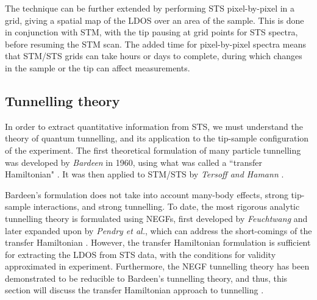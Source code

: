 The technique can be further extended by performing \ac{STS} pixel-by-pixel in a grid, giving a spatial map of the \ac{LDOS} over an area of the sample. This is done in conjunction with \ac{STM}, with the tip pausing at grid points for \ac{STS} spectra, before resuming the \ac{STM} scan. The added time for pixel-by-pixel spectra means that \ac{STM}/\ac{STS} grids can take hours or days to complete, during which changes in the sample or the tip can affect measurements. 


\subsection{Tunnelling theory}
In order to extract quantitative information from \ac{STS}, we must understand the theory of quantum tunnelling, and its application to the tip-sample configuration of the experiment. The first theoretical formulation of many particle tunnelling was developed by \textit{Bardeen} in 1960, using what was called a ``transfer Hamiltonian" \citep{PhysRevLett.6.57}. It was then applied to \ac{STM}/\ac{STS} by \textit{Tersoff and Hamann} \citep{0957-4484-17-8-R01,tersoff1985theory}. 

Bardeen's formulation does not take into account many-body effects, strong tip-sample interactions, and strong tunnelling. To date, the most rigorous analytic tunnelling theory is formulated using \acp{NEGF}, first developed by \textit{Feuchtwang} and later expanded upon by \textit{Pendry et al.}, which can address the short-comings of the transfer Hamiltonian \citep{feuchtwang1974tunneling, pendry1991theory}. However, the transfer Hamiltonian formulation is sufficient for extracting the \ac{LDOS} from \ac{STS} data, with the conditions for validity approximated in experiment. Furthermore, the \ac{NEGF} tunnelling theory has been demonstrated to be reducible to Bardeen's tunnelling theory, and thus, this section will discuss the transfer Hamiltonian approach to tunnelling \citep{0957-4484-17-8-R01}.

